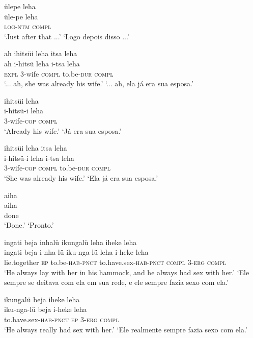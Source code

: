 \documentclass[output=paper,
modfonts,nonflat
]{langsci/langscibook}
\begin{document}
\ea  ülepe leha\\[.3em]
\gll üle-pe leha\\
     \textsc{log}-\textsc{ntm} \textsc{compl}\\
\glt ‘Just after that ...’
\glt ‘Logo depois disso ...’
\z

\newpage 
\ea  ah ihitsüi leha itsa leha\\[.3em]
\gll ah i-hitsü leha i-tsa leha\\
     \textsc{expl} 3-wife \textsc{compl} to.be-\textsc{dur} \textsc{compl}\\
\glt ‘... ah, she was already his wife.’
\glt ‘... ah, ela já era sua esposa.’
\z

\ea  ihitsüi leha\\[.3em]
\gll i-hitsü-i leha\\
     3-wife-\textsc{cop} \textsc{compl}\\
\glt ‘Already his wife.’
\glt ‘Já era sua esposa.’
\z

\ea  ihitsüi leha itsa leha\\[.3em]
\gll i-hitsü-i leha i-tsa leha\\
     3-wife-\textsc{cop} \textsc{compl} to.be-\textsc{dur} \textsc{compl}\\
\glt ‘She was already his wife.’
\glt ‘Ela já era sua esposa.’
\z

\ea  aiha\\[.3em]
\gll aiha\\
     done\\
\glt ‘Done.’
\glt ‘Pronto.’
\z

\ea  ingati beja inhalü ikungalü leha iheke leha\\[.3em]
\gll ingati beja i-nha-lü iku-nga-lü leha i-heke leha\\
     lie.together \textsc{ep} to.be-\textsc{hab}-\textsc{pnct} to.have.sex-\textsc{hab}-\textsc{pnct} \textsc{compl} 3-\textsc{erg} \textsc{compl}\\
\glt ‘He always lay with her in his hammock, and he always had sex with her.’
\glt ‘Ele sempre se deitava com ela em sua rede, e ele sempre fazia sexo com ela.’
\z

\newpage
\ea  ikungalü beja iheke leha\\[.3em]
\gll iku-nga-lü beja i-heke leha\\
     to.have.sex-\textsc{hab}-\textsc{pnct} \textsc{ep} 3-\textsc{erg} \textsc{compl}\\
\glt ‘He always really had sex with her.’
\glt ‘Ele realmente sempre fazia sexo com ela.’
\z
\end{document}
